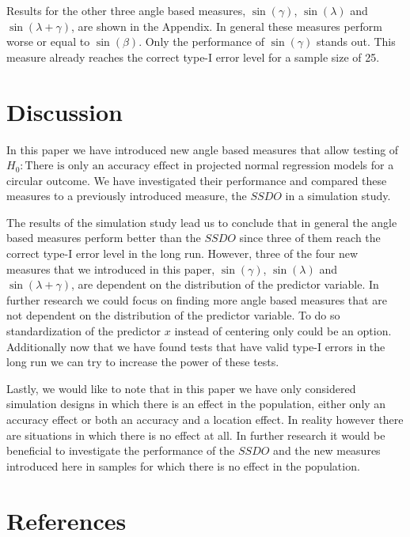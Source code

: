 \documentclass[]{interact}
\begin{document}
Results for the other three angle based measures, $\sin(\gamma)$,
$\sin(\lambda)$ and $\sin(\lambda + \gamma)$, are shown in the Appendix. In
general these measures perform worse or equal to $\sin(\beta)$. Only the
performance of $\sin(\gamma)$ stands out. This measure already reaches the
correct type-I error level for a sample size of 25. 





\section{Discussion}

In this paper we have introduced new angle based measures that allow testing of
\textit{$H_0: \text{There is only an accuracy effect}$} in projected normal regression
models for a circular outcome. We have investigated their performance and
compared these measures to a previously introduced measure, the $SSDO$ in a
simulation study.

The results of the simulation study lead us to conclude that in general the
angle based measures perform better than the $SSDO$ since three of them reach
the correct type-I error level in the long run. However, three of the four new
measures that we introduced in this paper, $\sin(\gamma)$, $\sin(\lambda)$ and
$\sin(\lambda + \gamma)$, are dependent on the distribution of the predictor
variable. In further research we could focus on finding more angle based
measures that are not dependent on the distribution of the predictor variable.
To do so standardization of the predictor $x$ instead of centering only could be
an option. Additionally now that we have found tests that have valid type-I
errors in the long run we can try to increase the power of these tests.

Lastly, we would like to note that in this paper we have only considered
simulation designs in which there is an effect in the population, either only an
accuracy effect or both an accuracy and a location effect. In reality however
there are situations in which there is no effect at all. In further research it
would be beneficial to investigate the performance of the $SSDO$ and the new
measures introduced here in samples for which there is no effect in the
population.



\section{References}
\end{document}
